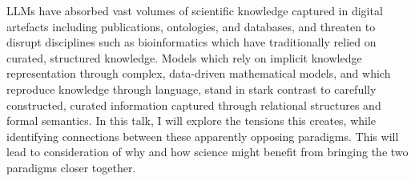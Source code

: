 LLMs have absorbed vast volumes of scientific knowledge captured in digital artefacts including publications, ontologies, and databases, and threaten to disrupt disciplines such as bioinformatics which have traditionally relied on curated, structured knowledge. Models which rely on implicit knowledge representation through complex, data-driven mathematical models, and which reproduce knowledge through language, stand in stark contrast to carefully constructed, curated information captured through relational structures and formal semantics. In this talk, I will explore the tensions this creates, while identifying connections between these apparently opposing paradigms. This will lead to consideration of why and how science might benefit from bringing the two paradigms closer together.